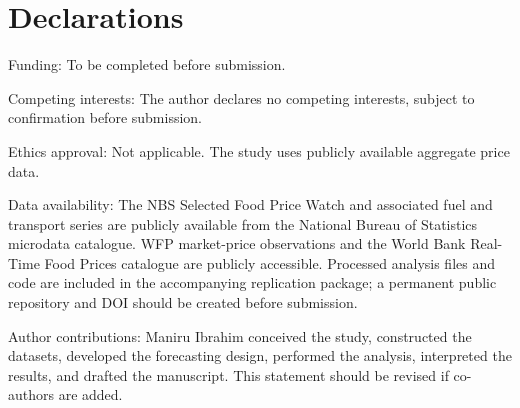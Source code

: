 \section*{Declarations}\label{declarations}

Funding: To be completed before submission.

Competing interests: The author declares no competing interests, subject
to confirmation before submission.

Ethics approval: Not applicable. The study uses publicly available
aggregate price data.

Data availability: The NBS Selected Food Price Watch and associated fuel
and transport series are publicly available from the National Bureau of
Statistics microdata catalogue. WFP market-price observations and the
World Bank Real-Time Food Prices catalogue are publicly accessible.
Processed analysis files and code are included in the accompanying
replication package; a permanent public repository and DOI should be
created before submission.

Author contributions: Maniru Ibrahim conceived the study, constructed
the datasets, developed the forecasting design, performed the analysis,
interpreted the results, and drafted the manuscript. This statement
should be revised if co-authors are added.
